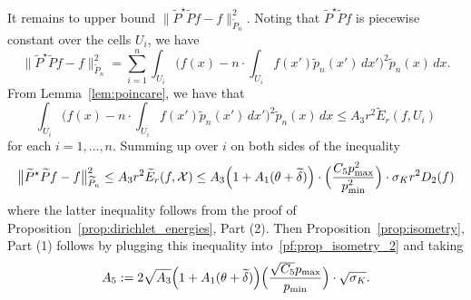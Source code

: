 \documentclass[twoside]{article}
\newcommand{\1}{\mathbf{1}}
\newcommand{\Xset}{\mathcal{X}}
\newcommand{\wt}[1]{\widetilde{#1}}
\theoremstyle{definition}
\theoremstyle{remark}
\begin{document}
It remains to upper bound $\bigl\|\wt{P}^{\star}\wt{P}f - f\bigr\|_{\wt{P}_n}^2$. Noting that $\wt{P}^{\star}\wt{P}f$ is piecewise constant over the cells $U_i$, we have
\begin{equation*}
\bigl\|\wt{P}^{\star}\wt{P}f - f\bigr\|_{\wt{P}_n}^2 = \sum_{i = 1}^{n} \int_{U_i} \biggl(f(x) - n\cdot\int_{U_i} f(x') \wt{p}_n(x') \,dx'\biggr)^2 \wt{p}_n(x) \,dx.
\end{equation*}
From Lemma~\ref{lem:poincare}, we have that
\begin{equation*}
\int_{U_i} \biggl(f(x) - n\cdot\int_{U_i} f(x') \wt{p}_n(x') \,dx'\biggr)^2 \wt{p}_n(x) \,dx \leq A_3r^2 \wt{E}_r(f,U_i)
\end{equation*}
for each $i = 1,\ldots,n$. Summing up over $i$ on both sides of the inequality
\begin{equation*}
\bigl\|\wt{P}^{\star}\wt{P}f - f\bigr\|_{\wt{P}_n}^2 \leq A_3r^2 \wt{E}_r(f,\Xset) \leq  A_3 \Bigl(1 + A_1(\theta + \wt{\delta})\Bigr) \cdot \Bigl(\frac{C_5 p_{\max}^2}{p_{\min}^2}\Bigr) \cdot \sigma_{K}r^2 D_2(f) 
\end{equation*}
where the latter inequality follows from the proof of Proposition~\ref{prop:dirichlet_energies}, Part (2). Then Proposition~\ref{prop:isometry}, Part (1) follows by plugging this inequality into~\eqref{pf:prop_isometry_2} and taking 
\begin{equation*}
A_5 := 2\sqrt{A_3} \Bigl(1 + A_1(\theta + \wt{\delta})\Bigr) \Bigl(\frac{\sqrt{C_5} p_{\max}}{p_{\min}}\Bigr) \cdot \sqrt{\sigma_{K}}.
\end{equation*}
\end{document}
